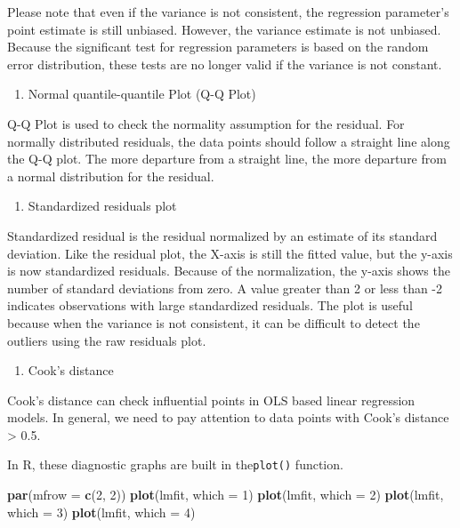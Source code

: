 \documentclass[12pt,]{krantz}
\makeatletter
\newenvironment{Shaded}{\begin{snugshade}}{\end{snugshade}}
\newcommand{\DataTypeTok}[1]{\textcolor[rgb]{0.27,0.27,0.27}{#1}}
\newcommand{\DecValTok}[1]{\textcolor[rgb]{0.06,0.06,0.06}{#1}}
\newcommand{\KeywordTok}[1]{\textcolor[rgb]{0.27,0.27,0.27}{\textbf{#1}}}
\newcommand{\NormalTok}[1]{#1}
\providecommand{\tightlist}{%
  \setlength{\itemsep}{0pt}\setlength{\parskip}{0pt}}
\newenvironment{kframe}{%
\medskip{}
\setlength{\fboxsep}{.8em}
 \def\at@end@of@kframe{}%
 \ifinner\ifhmode%
  \def\at@end@of@kframe{\end{minipage}}%
  \begin{minipage}{\columnwidth}%
 \fi\fi%
 \def\FrameCommand##1{\hskip\@totalleftmargin \hskip-\fboxsep
 \colorbox{shadecolor}{##1}\hskip-\fboxsep
     \hskip-\linewidth \hskip-\@totalleftmargin \hskip\columnwidth}%
 \MakeFramed {\advance\hsize-\width
   \@totalleftmargin\z@ \linewidth\hsize
   \@setminipage}}%
 {\par\unskip\endMakeFramed%
 \at@end@of@kframe}
\renewenvironment{Shaded}{\begin{kframe}}{\end{kframe}}
\makeatother
\begin{document}
Please note that even if the variance is not consistent, the regression parameter's point estimate is still unbiased. However, the variance estimate is not unbiased. Because the significant test for regression parameters is based on the random error distribution, these tests are no longer valid if the variance is not constant.

\begin{enumerate}
\def\labelenumi{(\arabic{enumi})}
\setcounter{enumi}{1}
\tightlist
\item
  Normal quantile-quantile Plot (Q-Q Plot) 
\end{enumerate}

Q-Q Plot is used to check the normality assumption for the residual. For normally distributed residuals, the data points should follow a straight line along the Q-Q plot. The more departure from a straight line, the more departure from a normal distribution for the residual.

\begin{enumerate}
\def\labelenumi{(\arabic{enumi})}
\setcounter{enumi}{2}
\tightlist
\item
  Standardized residuals plot 
\end{enumerate}

Standardized residual is the residual normalized by an estimate of its standard deviation. Like the residual plot, the X-axis is still the fitted value, but the y-axis is now standardized residuals. Because of the normalization, the y-axis shows the number of standard deviations from zero. A value greater than 2 or less than -2 indicates observations with large standardized residuals. The plot is useful because when the variance is not consistent, it can be difficult to detect the outliers using the raw residuals plot.

\begin{enumerate}
\def\labelenumi{(\arabic{enumi})}
\setcounter{enumi}{3}
\tightlist
\item
  Cook's distance 
\end{enumerate}

Cook's distance can check influential points in OLS based linear regression models. In general, we need to pay attention to data points with Cook's distance \textgreater{} 0.5.

In R, these diagnostic graphs are built in the\texttt{plot()} function.

\begin{Shaded}
\begin{Highlighting}[]
\KeywordTok{par}\NormalTok{(}\DataTypeTok{mfrow =} \KeywordTok{c}\NormalTok{(}\DecValTok{2}\NormalTok{, }\DecValTok{2}\NormalTok{))}
\KeywordTok{plot}\NormalTok{(lmfit, }\DataTypeTok{which =} \DecValTok{1}\NormalTok{)}
\KeywordTok{plot}\NormalTok{(lmfit, }\DataTypeTok{which =} \DecValTok{2}\NormalTok{)}
\KeywordTok{plot}\NormalTok{(lmfit, }\DataTypeTok{which =} \DecValTok{3}\NormalTok{)}
\KeywordTok{plot}\NormalTok{(lmfit, }\DataTypeTok{which =} \DecValTok{4}\NormalTok{)}
\end{Highlighting}
\end{Shaded}
\end{document}
